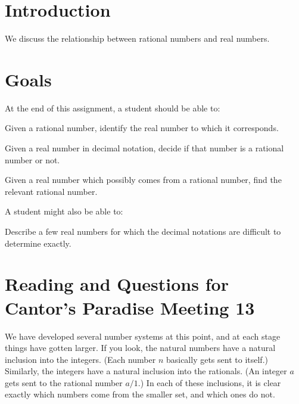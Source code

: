 \documentclass[12pt,letterpaper]{article}
\theoremstyle{definition}
\begin{document}
\setlength{\parskip}{1ex plus 0.5ex minus 0.2ex}
\setlength{\parindent}{0pt}

\pagestyle{fancy}
\cfoot{}

\section*{Introduction}
We discuss the relationship between rational numbers and real numbers.

\section*{Goals}
At the end of this assignment, a student should be able to:
\begin{compactitem}
\item Given a rational number, identify the real number to which it corresponds.
\item Given a real number in decimal notation, decide if that number is a rational number or not.
\item Given a real number which possibly comes from a rational number, find the relevant rational number.
\end{compactitem}
A student might also be able to:
\begin{compactitem}
\item Describe a few real numbers for which the decimal notations are difficult to determine exactly.
\end{compactitem}

\section*{Reading and Questions for Cantor's Paradise Meeting 13}

We have developed several number systems at this point, and at each stage things have gotten larger.
If you look, the natural numbers have a natural inclusion into the integers. 
(Each number $n$ basically gets sent to itself.)
Similarly, the integers have a natural inclusion into the rationals.
(An integer $a$ gets sent to the rational number $a/1$.)
In each of these inclusions, it is clear exactly which numbers come from the smaller set, and which ones do not.
\end{document}

